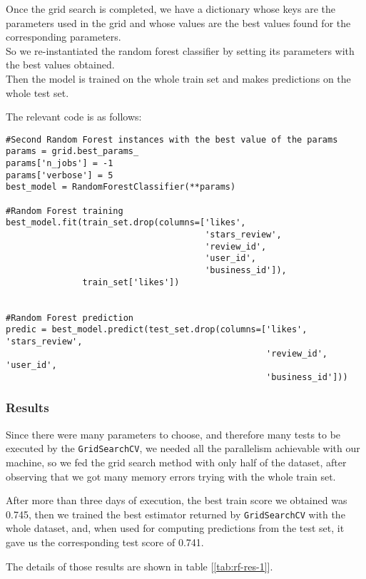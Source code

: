 Once the grid search is completed, we have a dictionary whose keys are the parameters used in the grid and whose values are the best values found for the corresponding parameters.\\
So we re-instantiated the random forest classifier by setting its parameters with the best values obtained.\\
Then the model is trained on the whole train set and makes predictions on the whole test set.

The relevant code is as follows:

\begin{lstlisting}[caption={Random Forest training and predictions}, label={lst:rf-fit}]
#Second Random Forest instances with the best value of the params
params = grid.best_params_
params['n_jobs'] = -1
params['verbose'] = 5
best_model = RandomForestClassifier(**params)

#Random Forest training
best_model.fit(train_set.drop(columns=['likes', 
                                       'stars_review', 
                                       'review_id', 
                                       'user_id', 
                                       'business_id']),
               train_set['likes'])


#Random Forest prediction 
predic = best_model.predict(test_set.drop(columns=['likes', 'stars_review',
                                                   'review_id', 'user_id', 
                                                   'business_id']))
\end{lstlisting}


\subsubsection{Results}

Since there were many parameters to choose, and therefore many tests to be executed by the \texttt{GridSearchCV}, we needed all the parallelism achievable with our machine, so we fed the grid search method with only half of the dataset, after observing that we got many memory errors trying with the whole train set.

After more than three days of execution, the best train score we obtained was 0.745, then we trained the best estimator returned by \texttt{GridSearchCV} with the whole dataset, and, when used for computing predictions from the test set, it gave us the corresponding test score of 0.741.

The details of those results are shown in table [\ref{tab:rf-res-1}].

